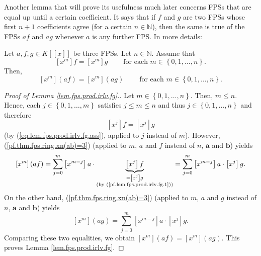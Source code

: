 Another lemma that will prove its usefulness much later concerns FPSs that are
equal up until a certain coefficient. It says that if $f$ and $g$ are two FPSs
whose first $n+1$ coefficients agree (for a certain $n\in\mathbb{N}$), then
the same is true of the FPSs $af$ and $ag$ whenever $a$ is any further FPS. In
more details:

\begin{lemma}
\label{lem.fps.prod.irlv.fg}Let $a,f,g\in K\left[  \left[  x\right]  \right]
$ be three FPSs. Let $n\in\mathbb{N}$. Assume that
\begin{equation}
\left[  x^{m}\right]  f=\left[  x^{m}\right]  g\ \ \ \ \ \ \ \ \ \ \text{for
each }m\in\left\{  0,1,\ldots,n\right\}  . \label{eq.lem.fps.prod.irlv.fg.ass}%
\end{equation}
Then,
\[
\left[  x^{m}\right]  \left(  af\right)  =\left[  x^{m}\right]  \left(
ag\right)  \ \ \ \ \ \ \ \ \ \ \text{for each }m\in\left\{  0,1,\ldots
,n\right\}  .
\]

\end{lemma}

\begin{proof}
[Proof of Lemma \ref{lem.fps.prod.irlv.fg}.]Let $m\in\left\{  0,1,\ldots
,n\right\}  $. Then, $m\leq n$. Hence, each $j\in\left\{  0,1,\ldots
,m\right\}  $ satisfies $j\leq m\leq n$ and thus $j\in\left\{  0,1,\ldots
,n\right\}  $ and therefore%
\begin{equation}
\left[  x^{j}\right]  f=\left[  x^{j}\right]  g
\label{pf.lem.fps.prod.irlv.fg.1}%
\end{equation}
(by (\ref{eq.lem.fps.prod.irlv.fg.ass}), applied to $j$ instead of $m$).
However, (\ref{pf.thm.fps.ring.xn(ab)=3}) (applied to $m$, $a$ and $f$ instead
of $n$, $\mathbf{a}$ and $\mathbf{b}$) yields%
\[
\left[  x^{m}\right]  \left(  af\right)  =\sum_{j=0}^{m}\left[  x^{m-j}%
\right]  a\cdot\underbrace{\left[  x^{j}\right]  f}_{\substack{=\left[
x^{j}\right]  g\\\text{(by (\ref{pf.lem.fps.prod.irlv.fg.1}))}}}=\sum
_{j=0}^{m}\left[  x^{m-j}\right]  a\cdot\left[  x^{j}\right]  g.
\]
On the other hand, (\ref{pf.thm.fps.ring.xn(ab)=3}) (applied to $m$, $a$ and
$g$ instead of $n$, $\mathbf{a}$ and $\mathbf{b}$) yields%
\[
\left[  x^{m}\right]  \left(  ag\right)  =\sum_{j=0}^{m}\left[  x^{m-j}%
\right]  a\cdot\left[  x^{j}\right]  g.
\]
Comparing these two equalities, we obtain $\left[  x^{m}\right]  \left(
af\right)  =\left[  x^{m}\right]  \left(  ag\right)  $. This proves Lemma
\ref{lem.fps.prod.irlv.fg}.
\end{proof}

